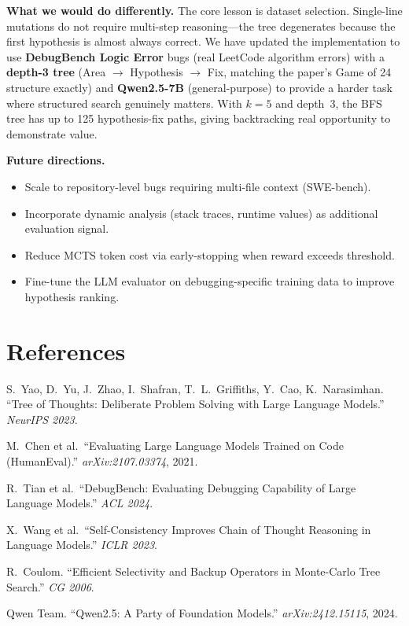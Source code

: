 \documentclass[11pt,letterpaper]{article}
\begin{document}
\textbf{What we would do differently.} The core lesson is dataset selection.
Single-line mutations do not require multi-step reasoning---the tree degenerates because
the first hypothesis is almost always correct. We have updated the implementation to use
\textbf{DebugBench Logic Error} bugs (real LeetCode algorithm errors) with a \textbf{depth-3
tree} (Area $\to$ Hypothesis $\to$ Fix, matching the paper's Game of 24 structure exactly)
and \textbf{Qwen2.5-7B} (general-purpose) to provide a harder task where structured search
genuinely matters. With $k{=}5$ and depth~3, the BFS tree has up to 125 hypothesis-fix paths,
giving backtracking real opportunity to demonstrate value.

\textbf{Future directions.}
\begin{itemize}[noitemsep,topsep=1pt]
  \item Scale to repository-level bugs requiring multi-file context (SWE-bench).
  \item Incorporate dynamic analysis (stack traces, runtime values) as additional evaluation signal.
  \item Reduce MCTS token cost via early-stopping when reward exceeds threshold.
  \item Fine-tune the LLM evaluator on debugging-specific training data to improve hypothesis ranking.
\end{itemize}

\section*{References}
\begin{enumerate}[label={[\arabic*]},noitemsep,topsep=2pt,leftmargin=*]
  \item S.\ Yao, D.\ Yu, J.\ Zhao, I.\ Shafran, T.\ L.\ Griffiths, Y.\ Cao, K.\ Narasimhan.
        ``Tree of Thoughts: Deliberate Problem Solving with Large Language Models.''
        \emph{NeurIPS 2023}.
  \item M.\ Chen et al.\ ``Evaluating Large Language Models Trained on Code (HumanEval).''
        \emph{arXiv:2107.03374}, 2021.
  \item R.\ Tian et al.\ ``DebugBench: Evaluating Debugging Capability of Large Language Models.''
        \emph{ACL 2024}.
  \item X.\ Wang et al.\ ``Self-Consistency Improves Chain of Thought Reasoning in Language Models.''
        \emph{ICLR 2023}.
  \item R.\ Coulom. ``Efficient Selectivity and Backup Operators in Monte-Carlo Tree Search.''
        \emph{CG 2006}.
  \item Qwen Team. ``Qwen2.5: A Party of Foundation Models.'' \emph{arXiv:2412.15115}, 2024.
\end{enumerate}
\end{document}
